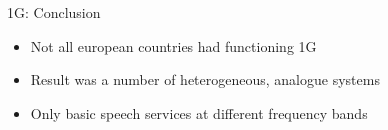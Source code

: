 \begin{frame}{1G: Conclusion}
  \begin{itemize}  
    \item Not all european countries had functioning 1G \cite{Gess2002}
    \item Result was a number of heterogeneous, analogue systems
    \item Only basic speech services at different frequency bands
  \end{itemize}
\end{frame}
